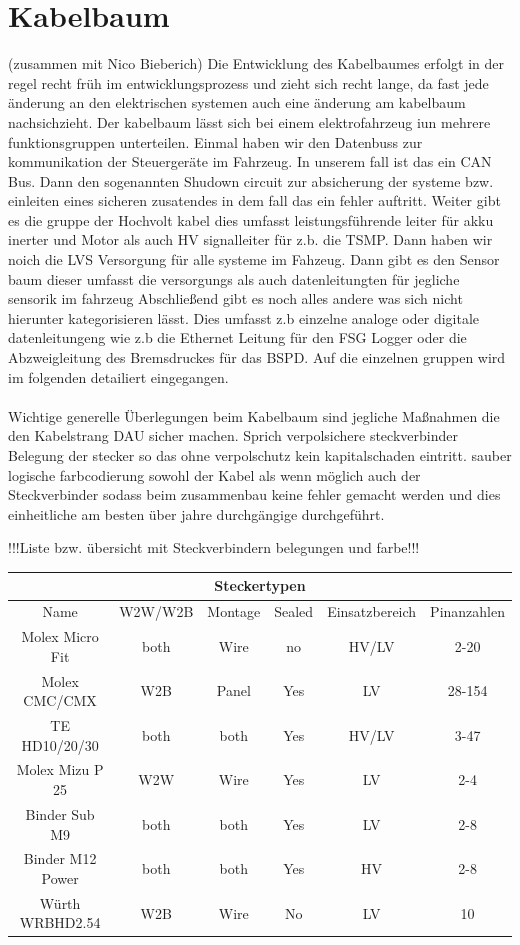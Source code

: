 \section{Kabelbaum} (zusammen mit Nico Bieberich)
Die Entwicklung des Kabelbaumes erfolgt in der regel recht früh im entwicklungsprozess und zieht sich recht lange, da fast jede änderung an den elektrischen systemen auch eine änderung am kabelbaum nachsichzieht. Der kabelbaum lässt sich bei einem elektrofahrzeug iun mehrere funktionsgruppen unterteilen. Einmal haben wir den Datenbuss zur kommunikation der Steuergeräte im Fahrzeug. In unserem fall ist das ein CAN Bus. Dann den sogenannten Shudown circuit zur absicherung der systeme bzw. einleiten eines sicheren zusatendes in dem fall das ein fehler auftritt. Weiter gibt es die gruppe der Hochvolt kabel dies umfasst leistungsführende leiter für akku inerter und Motor als auch HV signalleiter für z.b. die TSMP. Dann haben wir noich die LVS Versorgung für alle systeme im Fahzeug. Dann gibt es den Sensor baum dieser umfasst die versorgungs als auch datenleitungten für jegliche sensorik im fahrzeug  Abschließend gibt es noch alles andere was sich nicht hierunter kategorisieren lässt. Dies umfasst z.b einzelne analoge oder digitale datenleitungeng wie z.b die Ethernet Leitung für den FSG Logger oder die Abzweigleitung des Bremsdruckes für das BSPD. Auf die einzelnen gruppen wird im folgenden detailiert eingegangen.\\
\\
Wichtige generelle Überlegungen beim Kabelbaum sind jegliche Maßnahmen die den Kabelstrang DAU sicher machen. Sprich verpolsichere steckverbinder Belegung der stecker so das ohne verpolschutz kein kapitalschaden eintritt. sauber logische farbcodierung sowohl der Kabel als wenn möglich auch der Steckverbinder sodass beim zusammenbau keine fehler gemacht werden und dies einheitliche am besten über jahre durchgängige durchgeführt.

!!!Liste bzw. übersicht mit Steckverbindern belegungen und farbe!!!

\begin{tabular}{|c|c|c|c|c|c|}
	\hline
	\multicolumn{6}{|c|}{Steckertypen} \\
	\hline
	Name & W2W/W2B & Montage & Sealed & Einsatzbereich & Pinanzahlen \\
	\hline
	Molex Micro Fit & both & Wire & no & HV/LV & 2-20 \\
	\hline
	Molex CMC/CMX & W2B & Panel & Yes & LV  & 28-154 \\
	\hline
	TE HD10/20/30 & both & both & Yes & HV/LV & 3-47 \\
	\hline
	Molex Mizu P 25 & W2W & Wire & Yes & LV & 2-4 \\
	\hline
	Binder Sub M9 & both & both & Yes & LV & 2-8 \\
	\hline
	Binder M12 Power & both & both & Yes & HV & 2-8 \\
	\hline
	Würth WRBHD2.54 & W2B & Wire & No & LV & 10 \\
	\hline
\end{tabular}

